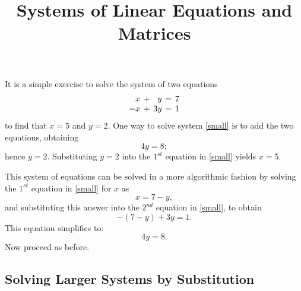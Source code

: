 \documentclass{ximera}
\title{Systems of Linear Equations and Matrices}
\begin{document}
\begin{abstract}
\end{abstract}
\maketitle


\label{S:2.1}

It is a simple exercise to solve the system of two equations
\begin{equation} \label{small}
\arraycolsep 2pt
\begin{array}{rcrcr}
 x & + & y & = & 7 \\
-x & + & 3y & = & 1
\end{array}
\end{equation}
to find that $x=5$ and $y=2$.  One way to solve
system \eqref{small} is to add the two equations, obtaining
\[
4y=8;
\]
hence $y=2$.  Substituting $y=2$ into the $1^{st}$ equation in
\eqref{small} yields $x=5$.

This system of equations can be solved in a more algorithmic
fashion by solving the $1^{st}$ equation in \eqref{small} for $x$
as
\[
x = 7 - y,
\]
and substituting this answer into the $2^{nd}$ equation in
\eqref{small}, to obtain
\[
-(7-y) +3y = 1.
\]
This equation simplifies to:
\[
4y = 8.
\]
Now proceed as before.

\subsection*{Solving Larger Systems by Substitution}
\end{document}
